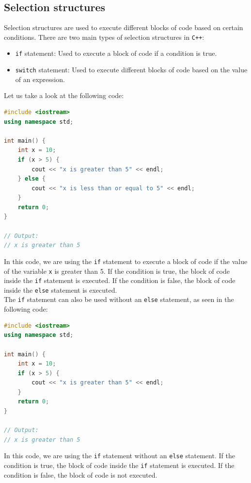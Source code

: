\subsection{Selection structures}

Selection structures are used to execute different blocks of code based on certain conditions. There are two main
types of selection structures in \texttt{C++}:

\begin{itemize}
    \item \texttt{if} statement: Used to execute a block of code if a condition is true.
    \item \texttt{switch} statement: Used to execute different blocks of code based on the value of an expression.
\end{itemize}

Let us take a look at the following code:

\begin{lstlisting}[language=C++]
#include <iostream>
using namespace std;

int main() {
    int x = 10;
    if (x > 5) {
        cout << "x is greater than 5" << endl;
    } else {
        cout << "x is less than or equal to 5" << endl;
    }
    return 0;
}

// Output:
// x is greater than 5
\end{lstlisting}

In this code, we are using the \texttt{if} statement to execute a block of code if the value of the variable \texttt{x}
is greater than 5. If the condition is true, the block of code inside the \texttt{if} statement is executed. If the
condition is false, the block of code inside the \texttt{else} statement is executed.\\

The \texttt{if} statement can also be used without an \texttt{else} statement, as seen in the following code:

\begin{lstlisting}[language=C++]
#include <iostream>
using namespace std;

int main() {
    int x = 10;
    if (x > 5) {
        cout << "x is greater than 5" << endl;
    } 
    return 0;
}

// Output:
// x is greater than 5
\end{lstlisting}

In this code, we are using the \texttt{if} statement without an \texttt{else} statement. If the condition is true,
the block of code inside the \texttt{if} statement is executed. If the condition is false, the block of code is not
executed.\\

